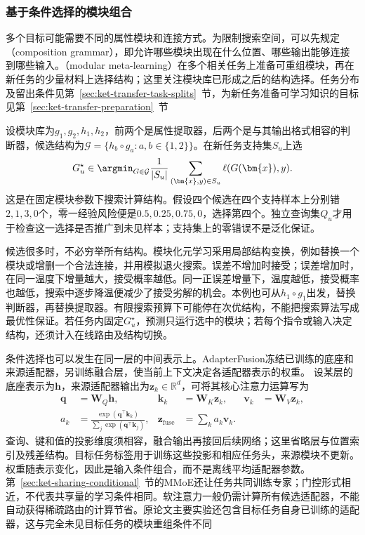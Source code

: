 \subsubsection{基于条件选择的模块组合}
\label{sec:ket-integration-conditional-modules}

多个目标可能需要不同的属性模块和连接方式。为限制搜索空间，可以先规定（composition grammar），即允许哪些模块出现在什么位置、哪些输出能够连接到哪些输入。（modular meta-learning）在多个相关任务上准备可重组模块，再在新任务的少量材料上选择结构；这里关注模块库已形成之后的结构选择。任务分布及留出条件见第~\ref{sec:ket-transfer-task-splits}~节，为新任务准备可学习知识的目标见第~\ref{sec:ket-transfer-preparation}~节

设模块库为$g_1,g_2,h_1,h_2$，前两个是属性提取器，后两个是与其输出格式相容的判断器，候选结构为$\mathcal{G}=\{h_b\circ g_a:a,b\in\{1,2\}\}$。在新任务支持集$S_u$上选
\begin{equation}
  G_u^\star\in\argmin_{G\in\mathcal{G}}
  \frac{1}{|S_u|}\sum_{(\bm{x},y)\in S_u}\ell(G(\bm{x}),y).
  \label{eq:ket-integration-structure-search}
\end{equation}
这是在固定模块参数下搜索计算结构。假设四个候选在四个支持样本上分别错$2,1,3,0$个，零一经验风险便是$0.5,0.25,0.75,0$，选择第四个。独立查询集$Q_u$才用于检查这一选择是否推广到未见样本；支持集上的零错误不是泛化保证。

候选很多时，不必穷举所有结构。模块化元学习采用局部结构变换，例如替换一个模块或增删一个合法连接，并用模拟退火搜索。误差不增加时接受；误差增加时，在同一温度下增量越大，接受概率越低。同一正误差增量下，温度越低，接受概率也越低，搜索中逐步降温便减少了接受劣解的机会。本例也可从$h_1\circ g_1$出发，替换判断器，再替换提取器。有限搜索预算下可能停在次优结构，不能把搜索算法写成最优性保证。若任务内固定$G_u^\star$，预测只运行选中的模块；若每个指令或输入决定结构，还须计入在线路由及结构切换。

条件选择也可以发生在同一层的中间表示上。AdapterFusion冻结已训练的底座和来源适配器，另训练融合层，使当前上下文决定各适配器表示的权重。
设某层的底座表示为$\bm{h}$，来源适配器输出为$\bm{z}_k\in\mathbb{R}^{d}$，可将其核心注意力运算写为
\begin{equation}
  \begin{aligned}
    \bm{q}&=\bm{W}_{Q}\bm{h},&
    \bm{k}_k&=\bm{W}_{K}\bm{z}_k,&
    \bm{v}_k&=\bm{W}_{V}\bm{z}_k,\\
    a_k&=\frac{\exp(\bm{q}^{\top}\bm{k}_k)}
                  {\sum_j\exp(\bm{q}^{\top}\bm{k}_j)},&
    \bm{z}_{\mathrm{fuse}}&=\sum_k a_k\bm{v}_k.
  \end{aligned}
  \label{eq:ket-integration-adapter-attention}
\end{equation}
查询、键和值的投影维度须相容，融合输出再接回后续网络；这里省略层与位置索引及残差结构。目标任务标签用于训练这些投影和相应任务头，来源模块不更新。权重随表示变化，因此是输入条件组合，而不是离线平均适配器参数。第~\ref{sec:ket-sharing-conditional}~节的MMoE还让任务共同训练专家；门控形式相近，不代表共享量的学习条件相同。软注意力一般仍需计算所有候选适配器，不能自动获得稀疏路由的计算节省。原论文主要实验还包含目标任务自身已训练的适配器，这与完全未见目标任务的模块重组条件不同

